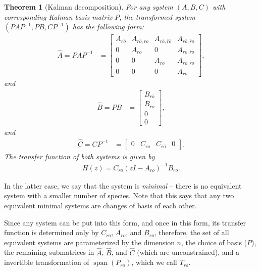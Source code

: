 \documentclass[11 pt]{article}
\newcommand{\ro}{{ro}}
\newcommand{\nro}{{\bar{r}o}}
\newcommand{\rno}{{r\bar{o}}}
\newcommand{\nrno}{{\bar{r}\bar{o}}}
\DeclareMathOperator{\spn}{span}
\newtheorem{theorem}{Theorem}
\begin{document}
\begin{theorem}[Kalman decomposition] \label{thm:kalman}
        For any system $(A,B,C)$ with corresponding Kalman basis matrix $P$,
        the transformed system $(PAP^{-1},PB,CP^{-1})$  has the following form:
        \begin{align*}
            \widehat A = PAP^{-1}
            &=
            \left[ \begin{array}{cccc}
                A_{\rno} & A_{\rno,\ro} & A_{\rno,\nrno} & A_{\rno,\nro} \\
                0 & A_{\ro} & 0 & A_{\ro,\nro} \\
                0 & 0 & A_{\nrno} & A_{\nrno,\nro} \\
                0 & 0 & 0 & A_{\nro}
            \end{array} \right] ,
        \end{align*}
        and
        \begin{align*}
            \widehat B = PB
            &=
            \left[ \begin{array}{cccc}
                B_{\rno} \\
                B_{\ro} \\
                0 \\
                0 
            \end{array} \right] ,
        \end{align*}
        and
        \begin{align*}
            \widehat C = CP^{-1}
            &=
            \left[ \begin{array}{cccc}
                0 & C_{\ro} & C_{\nrno} & 0 
            \end{array} \right] .
        \end{align*}
        The transfer function of both systems is given by
        \begin{align*}
            H(z) = C_{\ro} ( zI - A_{\ro} )^{-1} B_{\ro} .
        \end{align*}
\end{theorem}

In the latter case, we say that the system is \emph{minimal} 
-- there is no equivalent system with a smaller number of species.
Note that this says that any two equivalent minimal systems
are changes of basis of each other.

Since any system can be put into this form,
and once in this form, its transfer function is determined only by 
$C_{\ro}$, $A_{\ro}$, and $B_\ro$,
therefore, the set of all equivalent systems are parameterized by
the dimension $n$,
the choice of basis ($P$),
the remaining submatrices in $\widehat A$, $\widehat B$, and $\widehat C$
(which are unconstrained),
and a invertible transformation of $\spn(P_{\ro})$, which we call $T_\ro$.
\end{document}
